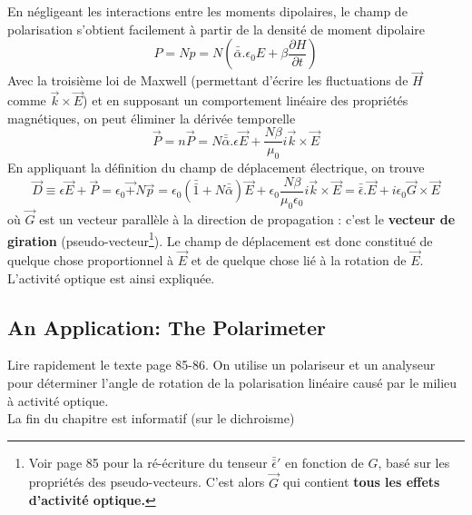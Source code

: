 En négligeant les interactions entre les moments dipolaires, le champ de polarisation s'obtient facilement
à partir de la densité de moment dipolaire
\begin{equation}
P = Np = N\left( \bar{\bar{\alpha}}.\epsilon_0E + \beta\dfrac{\partial H}{\partial t} \right)
\end{equation}
Avec la troisième loi de Maxwell (permettant d'écrire les fluctuations de $\vec{H}$ comme $\vec k \times
\vec E$) et en supposant un comportement linéaire des propriétés magnétiques, on peut éliminer la dérivée
temporelle
\begin{equation}
\vec P = n\vec P = N\bar{\bar{\alpha}}.\epsilon\vec  E+\dfrac{N\beta}{\mu_0}i\vec k\times \vec{E}
\end{equation}
En appliquant la définition du champ de déplacement électrique, on trouve
\begin{equation}
\vec D \equiv \epsilon\vec E+\vec P = \epsilon_0\vec +N\vec p = \epsilon_0\left(\bar{\bar{1}}+N
\bar{\bar{\alpha}}\right)\vec E + \epsilon_0\dfrac{N\beta}{\mu_0\epsilon_0}i\vec k\times\vec E =
\bar{\bar{\epsilon}}.\vec E+i\epsilon_0\vec G\times\vec E
\end{equation}
où $\vec G$ est un vecteur parallèle à la direction de propagation : c'est le \textbf{vecteur de giration}
(pseudo-vecteur\footnote{Voir page 85 pour la ré-écriture du tenseur $\bar{\bar{\epsilon}}'$ en fonction
de $G$, basé sur les propriétés des pseudo-vecteurs. C'est alors $\vec{G}$ qui contient \textbf{tous les
effets d'activité optique.}}). Le champ de déplacement est donc constitué de quelque chose proportionnel à
$\vec E$ et de quelque chose lié à la rotation de $\vec E$. L'activité optique est ainsi expliquée.\\

\subsection{An Application: The Polarimeter}
Lire rapidement le texte page 85-86. On utilise un polariseur et un analyseur pour déterminer l'angle de 
rotation de la polarisation linéaire causé par le milieu à activité optique.\\


La fin du chapitre est informatif (sur le dichroisme)